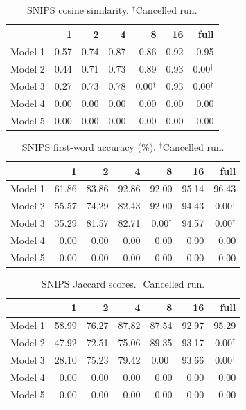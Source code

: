 \documentclass[11pt]{article}
\begin{document}
\begin{table}[t]
\centering
\small
\setlength{\tabcolsep}{4pt}
\begin{tabular}{lrrrrrr}
\toprule
 & 1 & 2 & 4 & 8 & 16 & full \\
\midrule
Model 1 & 0.57 & 0.74 & 0.87 & 0.86 & 0.92 & 0.95 \\
Model 2 & 0.44 & 0.71 & 0.73 & 0.89 & 0.93 & 0.00$^{\dagger}$ \\
Model 3 & 0.27 & 0.73 & 0.78 & 0.00$^{\dagger}$ & 0.93 & 0.00$^{\dagger}$ \\
Model 4 & 0.00 & 0.00 & 0.00 & 0.00 & 0.00 & 0.00 \\
Model 5 & 0.00 & 0.00 & 0.00 & 0.00 & 0.00 & 0.00 \\
\bottomrule
\end{tabular}
\caption{SNIPS cosine similarity. $^{\dagger}$Cancelled run.}
\label{tab:snips-cos}
\end{table}

\begin{table}[t]
\centering
\small
\setlength{\tabcolsep}{4pt}
\begin{tabular}{lrrrrrr}
\toprule
 & 1 & 2 & 4 & 8 & 16 & full \\
\midrule
Model 1 & 61.86 & 83.86 & 92.86 & 92.00 & 95.14 & 96.43 \\
Model 2 & 55.57 & 74.29 & 82.43 & 92.00 & 94.43 & 0.00$^{\dagger}$ \\
Model 3 & 35.29 & 81.57 & 82.71 & 0.00$^{\dagger}$ & 94.57 & 0.00$^{\dagger}$ \\
Model 4 & 0.00 & 0.00 & 0.00 & 0.00 & 0.00 & 0.00 \\
Model 5 & 0.00 & 0.00 & 0.00 & 0.00 & 0.00 & 0.00 \\
\bottomrule
\end{tabular}
\caption{SNIPS first-word accuracy (\%). $^{\dagger}$Cancelled run.}
\label{tab:snips-fw}
\end{table}

\begin{table}[t]
\centering
\small
\setlength{\tabcolsep}{4pt}
\begin{tabular}{lrrrrrr}
\toprule
 & 1 & 2 & 4 & 8 & 16 & full \\
\midrule
Model 1 & 58.99 & 76.27 & 87.82 & 87.54 & 92.97 & 95.29 \\
Model 2 & 47.92 & 72.51 & 75.06 & 89.35 & 93.17 & 0.00$^{\dagger}$ \\
Model 3 & 28.10 & 75.23 & 79.42 & 0.00$^{\dagger}$ & 93.66 & 0.00$^{\dagger}$ \\
Model 4 & 0.00 & 0.00 & 0.00 & 0.00 & 0.00 & 0.00 \\
Model 5 & 0.00 & 0.00 & 0.00 & 0.00 & 0.00 & 0.00 \\
\bottomrule
\end{tabular}
\caption{SNIPS Jaccard scores. $^{\dagger}$Cancelled run.}
\label{tab:snips-jaccard}
\end{table}
\end{document}

